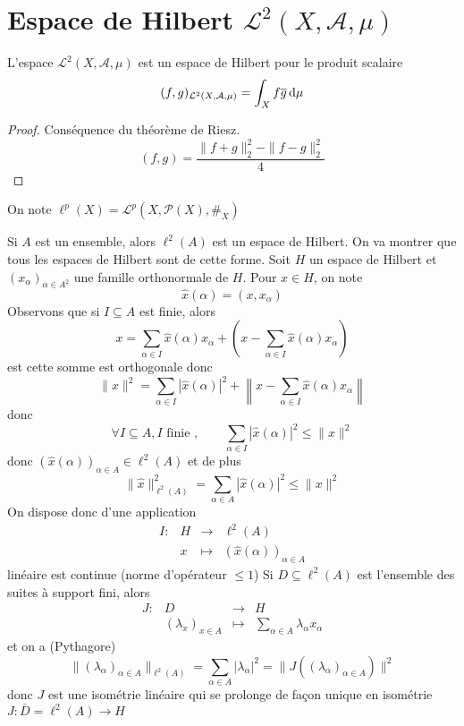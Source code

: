 \section{Espace de Hilbert \texorpdfstring{$\mathcal  L^2(X, \mathcal  A, \mu)$}{L2(X, A, mu)}}

\begin{thm}
    L'espace $\mathcal  L^2(X, \mathcal  A, \mu)$ est un espace de Hilbert pour le produit scalaire \[
        (f, g)_{\mathcal  L^2(X, \mathcal  A, \mu)}=\int_Xf\overline{g}\mathop{}\!\mathrm d\mu
    \] 
\end{thm}

\begin{proof}
Conséquence du théorème de Riesz. \[
(f,g) =\frac{\|f+g\|_2^2 -\|f-g\|_2^2}{4}
\] 
\end{proof}


\begin{dfn}
    On note $\ell^p(X)=\mathcal  L^p(X, \mathcal  P(X), \#_X)$
\end{dfn}

Si $A$ est un ensemble, alors  $\ell^2(A)$ est un espace de Hilbert. On va montrer que tous les espaces de Hilbert sont de cette forme. Soit $H$ un espace de Hilbert et  $(x_{\alpha})_{\alpha \in  A^2 }$ une famille orthonormale de $H$. Pour  $x \in  H$, on note \[
    \hat{x} (\alpha) = (x, x_\alpha)
\] 
Observons que si $I \subseteq A$ est finie, alors  \[
    x=\sum_{\alpha \in  I} \hat{x} (\alpha)x_\alpha + \left( x-\sum_{\alpha \in  I} \hat{x} (\alpha)x_\alpha \right)
\] 
est cette somme est orthogonale donc \[
    \|x\|^2 = \sum_{\alpha \in  I} |\hat{x}(\alpha)|^2 + \left\|x-\sum_{\alpha \in  I} \hat{x}(\alpha)x_\alpha\right\|
\] 
donc \[
    \forall I\subseteq A, I \text{ finie }, \qquad  \sum_{\alpha \in  I} |\hat{x}(\alpha)|^2 \leq  \|x\|^2 
\] 
donc $(\hat{x}(\alpha))_{\alpha\in A} \in  \ell^2(A)$ et de plus \[
    \|\hat{x}\|^2_{\ell^2(A)}=\sum_{\alpha \in  A} |\hat{x}(\alpha)|^2 \leq \|x\|^2 
\] 
On dispose donc d'une application \[
\begin{array}{rrcl}
    I:& H & \longrightarrow & \ell^2(A) \\
      & x & \longmapsto & \displaystyle (\hat{x}(\alpha))_{\alpha \in  A}
\end{array}
\] 
linéaire est continue (norme d'opérateur $\leq 1$)
Si $D\subseteq \ell^2(A)$ est l'ensemble des suites à support fini, alors \[
\begin{array}{rrcl}
    J:& D & \longrightarrow & H \\
      & (\lambda_x)_{x \in  A} & \longmapsto & \displaystyle \sum_{\alpha \in A} \lambda_\alpha x_\alpha
\end{array}
\] 
et on a (Pythagore) \[
    \|(\lambda_\alpha)_{\alpha \in A}\|_{\ell^2(A)}=\sum_{\alpha \in  A}|\lambda_\alpha|^2 = \|J((\lambda_\alpha)_{\alpha \in  A})\|^2 
\] 
donc $J$ est une isométrie linéaire qui se prolonge de façon unique en isométrie  $J:\bar{D}=\ell^2(A) \longrightarrow H$ 

